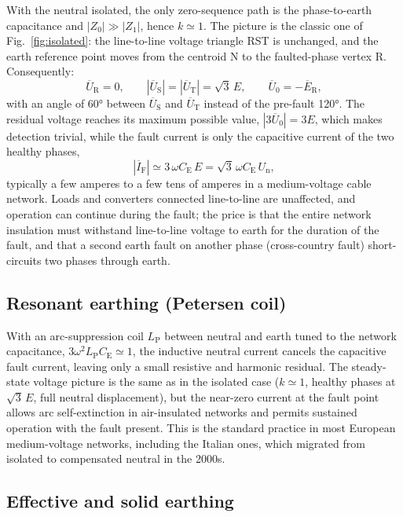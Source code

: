 \documentclass[a4paper,11pt]{article}
\newcommand{\ph}[1]{\mathrm{#1}}
\newcommand{\pE}[1]{\overline{E}_{\ph{#1}}}
\newcommand{\pU}[1]{\overline{U}_{\ph{#1}}}
\newcommand{\pI}[1]{\overline{I}_{#1}}
\begin{document}
With the neutral isolated, the only zero-sequence path is the phase-to-earth
capacitance and $|Z_{0}|\gg|Z_{1}|$, hence $k\simeq 1$. The picture is the
classic one of Fig.~\ref{fig:isolated}: the line-to-line voltage triangle RST
is unchanged, and the earth reference point moves from the centroid N to the
faulted-phase vertex R. Consequently:
\begin{equation}
\pU{R}=0, \qquad
|\pU{S}| = |\pU{T}| = \sqrt{3}\,E, \qquad
\overline{U}_{0} = -\pE{R},
\end{equation}
with an angle of \ang{60} between $\pU{S}$ and $\pU{T}$ instead of the
pre-fault \ang{120}. The residual voltage reaches its maximum possible value,
$|3\overline{U}_{0}| = 3E$, which makes detection trivial, while the fault
current is only the capacitive current of the two healthy phases,
\begin{equation}
|\pI{\ph{F}}| \simeq 3\,\omega C_\mathrm{E}\,E
            = \sqrt{3}\,\omega C_\mathrm{E}\,U_\mathrm{n},
\end{equation}
typically a few amperes to a few tens of amperes in a medium-voltage cable
network. Loads and converters connected line-to-line are unaffected, and
operation can continue during the fault; the price is that the entire network
insulation must withstand line-to-line voltage to earth for the duration of
the fault, and that a second earth fault on another phase (cross-country
fault) short-circuits two phases through earth.

\subsection{Resonant earthing (Petersen coil)}

With an arc-suppression coil $L_\mathrm{P}$ between neutral and earth tuned to
the network capacitance, $3\omega^{2}L_\mathrm{P}C_\mathrm{E}\simeq 1$, the
inductive neutral current cancels the capacitive fault current, leaving only a
small resistive and harmonic residual. The steady-state voltage picture is the
same as in the isolated case ($k\simeq 1$, healthy phases at $\sqrt{3}\,E$,
full neutral displacement), but the near-zero current at the fault point
allows arc self-extinction in air-insulated networks and permits sustained
operation with the fault present. This is the standard practice in most
European medium-voltage networks, including the Italian ones, which migrated
from isolated to compensated neutral in the 2000s.

\subsection{Effective and solid earthing}
\end{document}

